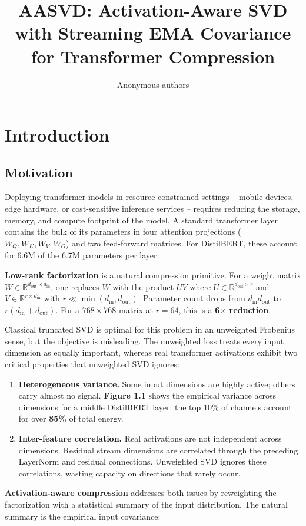 \title{\textbf{AASVD: Activation-Aware SVD with Streaming EMA Covariance for Transformer Compression}}

\author{Anonymous authors}



\section{Introduction}

\subsection{Motivation}

Deploying transformer models in resource-constrained settings -- mobile 
devices, edge hardware, or cost-sensitive inference services -- requires 
reducing the storage, memory, and compute footprint of the model. A 
standard transformer layer contains the bulk of its parameters in four 
attention projections ($W_Q, W_K, W_V, W_O$) and two feed-forward matrices. 
For DistilBERT, these account for 6.6M of the 6.7M parameters per layer.

\textbf{Low-rank factorization} is a natural compression primitive. For a weight 
matrix $W \in \mathbb{R}^{d_\text{out} \times d_\text{in}}$, one replaces 
$W$ with the product $U V$ where $U \in \mathbb{R}^{d_\text{out} \times r}$ 
and $V \in \mathbb{R}^{r \times d_\text{in}}$ with $r \ll \min(d_\text{in}, d_\text{out})$. 
Parameter count drops from $d_\text{in} d_\text{out}$ to $r(d_\text{in} + d_\text{out})$. 
For a $768 \times 768$ matrix at $r = 64$, this is a \textbf{6$\times$ reduction}.

Classical truncated SVD is optimal for this problem in an unweighted Frobenius 
sense, but the objective is misleading. The unweighted loss treats every 
input dimension as equally important, whereas real transformer activations 
exhibit two critical properties that unweighted SVD ignores:

\begin{enumerate}
\item \textbf{Heterogeneous variance.} Some input dimensions are highly active;
  others carry almost no signal. \textbf{Figure 1.1} shows the empirical variance
  across dimensions for a middle DistilBERT layer: the top 10\% of channels
  account for over \textbf{85\%} of total energy.

\item \textbf{Inter-feature correlation.} Real activations are not independent
  across dimensions. Residual stream dimensions are correlated through the
  preceding LayerNorm and residual connections. Unweighted SVD ignores
  these correlations, wasting capacity on directions that rarely occur.

\end{enumerate}
\textbf{Activation-aware compression} addresses both issues by reweighting the 
factorization with a statistical summary of the input distribution. The 
natural summary is the empirical input covariance:

